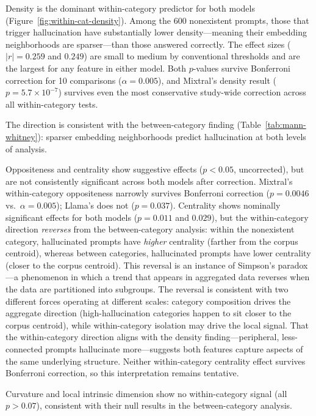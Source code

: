 Density is the dominant within-category predictor for both models (Figure~\ref{fig:within-cat-density}). Among the 600 nonexistent prompts, those that trigger hallucination have substantially lower density---meaning their embedding neighborhoods are sparser---than those answered correctly. The effect sizes ($|r| = 0.259$ and $0.249$) are small to medium by conventional thresholds and are the largest for any feature in either model. Both $p$-values survive Bonferroni correction for 10 comparisons ($\alpha = 0.005$), and Mixtral's density result ($p = 5.7 \times 10^{-7}$) survives even the most conservative study-wide correction across all within-category tests.

The direction is consistent with the between-category finding (Table~\ref{tab:mann-whitney}): sparser embedding neighborhoods predict hallucination at both levels of analysis.

Oppositeness and centrality show suggestive effects ($p < 0.05$, uncorrected), but are not consistently significant across both models after correction. Mixtral's within-category oppositeness narrowly survives Bonferroni correction ($p = 0.0046$ vs.\ $\alpha = 0.005$); Llama's does not ($p = 0.037$). Centrality shows nominally significant effects for both models ($p = 0.011$ and $0.029$), but the within-category direction \emph{reverses} from the between-category analysis: within the nonexistent category, hallucinated prompts have \emph{higher} centrality (farther from the corpus centroid), whereas between categories, hallucinated prompts have lower centrality (closer to the corpus centroid). This reversal is an instance of Simpson's paradox---a phenomenon in which a trend that appears in aggregated data reverses when the data are partitioned into subgroups. The reversal is consistent with two different forces operating at different scales: category composition drives the aggregate direction (high-hallucination categories happen to sit closer to the corpus centroid), while within-category isolation may drive the local signal. That the within-category direction aligns with the density finding---peripheral, less-connected prompts hallucinate more---suggests both features capture aspects of the same underlying structure. Neither within-category centrality effect survives Bonferroni correction, so this interpretation remains tentative.

Curvature and local intrinsic dimension show no within-category signal (all $p > 0.07$), consistent with their null results in the between-category analysis.

